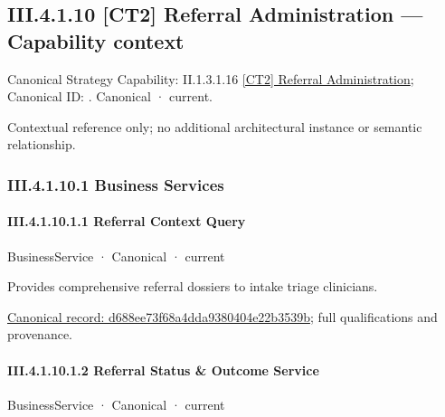 \subsection*{III.4.1.10 [CT2] Referral Administration — Capability context}
\label{navigation:III.4.1.10}

{\small Canonical Strategy Capability: II.1.3.1.16 \hyperref[element:ae0de25600ee416aa24d2a167b64f230]{[CT2] Referral Administration}; Canonical ID: \texttt{}. Canonical · current.}\par
Contextual reference only; no additional architectural instance or semantic relationship.\par
\subsubsection*{III.4.1.10.1 Business Services}
\label{navigation:III.4.1.10.1}

\paragraph*{III.4.1.10.1.1 Referral Context Query}
\label{navigation:III.4.1.10.1.1}

\label{element:d688ee73f68a4dda9380404e22b3539b}
{\small BusinessService · Canonical · current}\par

Provides comprehensive referral dossiers to intake triage clinicians.


{\footnotesize \href{../../../../continuum/business/business-service/d688ee73f68a4dda9380404e22b3539b.md}{Canonical record: d688ee73f68a4dda9380404e22b3539b}; full qualifications and provenance.}\par
\paragraph*{III.4.1.10.1.2 Referral Status \& Outcome Service}
\label{navigation:III.4.1.10.1.2}

\label{element:dfd0481be6124da0a791db41a5e9c238}
{\small BusinessService · Canonical · current}\par

